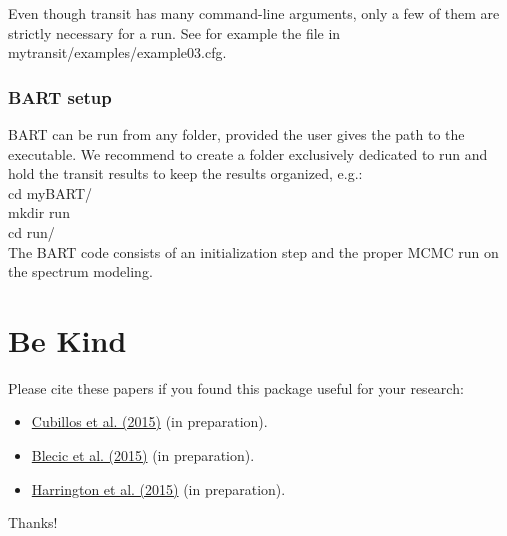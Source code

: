 \documentclass[letterpaper, 12pt]{article}
\begin{document}
Even though transit has many command-line arguments, only a few of
them are strictly necessary for a run.  See for example the file in
{\tttm mytransit/examples/example03.cfg}.  

\subsubsection{BART setup}

BART can be run from any folder, provided the user gives the path to
the executable.  We recommend to create a folder exclusively dedicated
to run and hold the transit results to keep the results organized,
e.g.: \\
{\tttb cd myBART/}   \\
{\tttb mkdir run}    \\
{\tttb cd run/}      \\

The BART code consists of an initialization step and the proper MCMC
run on the spectrum modeling.





\section{Be Kind}
\label{sec:bekind}
Please cite these papers if you found this package useful for your
research:
\begin{itemize}
\item \href{https://github.com/pcubillos/transit}{Cubillos et
    al. (2015)} (in preparation).

\item \href{https://github.com/dzesmin/}{Blecic et al. (2015)} (in
            preparation).
\item \href{https://github.com/dzesmin/}{Harrington et al. (2015)} (in
            preparation).
\end{itemize}
Thanks!




\end{document}
